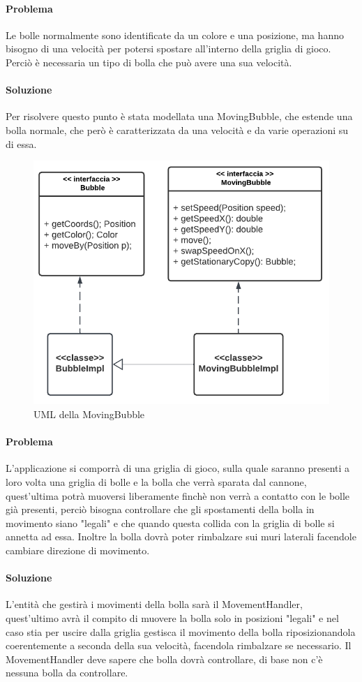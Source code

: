 \documentclass[a4paper,12pt]{report}
\begin{document}
\paragraph{Problema} Le bolle normalmente sono identificate da un colore e una posizione, ma hanno bisogno di una velocità per potersi spostare all'interno della griglia di gioco.
Perciò è necessaria un tipo di bolla che può avere una sua velocità.

\paragraph{Soluzione} Per risolvere questo punto è stata modellata una MovingBubble, che estende una bolla normale, che però è caratterizzata da una velocità e da varie operazioni su di essa.

\begin{figure}[H]
	\centering{}
	\includegraphics[width=.7\textwidth]{img/movingbubble.pdf}
	\caption{UML della MovingBubble}
\end{figure}

\paragraph{Problema} L'applicazione si comporrà di una griglia di gioco, sulla quale saranno presenti a loro volta una griglia di bolle e la bolla che verrà sparata dal cannone,
quest'ultima potrà muoversi liberamente finchè non verrà a contatto con le bolle già presenti, perciò bisogna controllare che gli spostamenti della bolla in
movimento siano "legali" e che quando questa collida con la griglia di bolle si annetta ad essa.
Inoltre la bolla dovrà poter rimbalzare sui muri laterali facendole cambiare direzione di movimento.

\paragraph{Soluzione} L'entità che gestirà i movimenti della bolla sarà il MovementHandler, quest'ultimo avrà il compito di muovere la bolla solo in posizioni "legali" e nel caso stia per uscire dalla griglia
gestisca il movimento della bolla riposizionandola coerentemente a seconda della sua velocità, facendola rimbalzare se necessario.
Il MovementHandler deve sapere che bolla dovrà controllare, di base non c'è nessuna bolla da controllare.  
\end{document}
